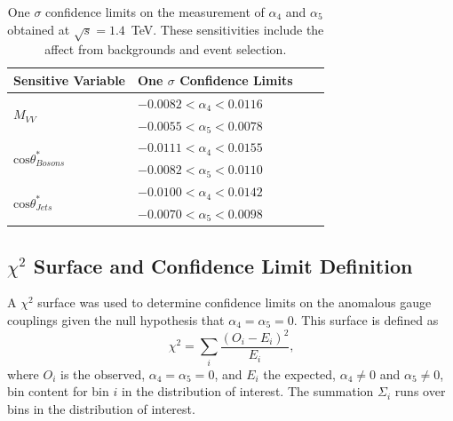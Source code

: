 \begin{table}[h!]
\centering
\begin{tabular}{l l l l}
\hline
Sensitive Variable & One $\sigma$ Confidence Limits \\
\hline
\multirow{ 2}{*}{$M_{VV}$} 					& $-0.0082 < \alpha_{4} < 0.0116$ \\
										& $-0.0055 < \alpha_{5} < 0.0078$ \\
\hline
\multirow{ 2}{*}{$\text{cos}\theta^{*}_{Bosons}$} 	& $-0.0111 < \alpha_{4} < 0.0155$ \\
										& $-0.0082 < \alpha_{5} < 0.0110$ \\
\hline
\multirow{ 2}{*}{$\text{cos}\theta^{*}_{Jets}$} 		& $-0.0100 < \alpha_{4} < 0.0142$ \\
										& $-0.0070 < \alpha_{5} < 0.0098$ \\
\end{tabular}
\caption[One $\sigma$ confidence limits on the measurement of $\alpha_{4}$ and $\alpha_{5}$ obtained at $\sqrt{s} = 1.4$~TeV.  These sensitivities include the affect from backgrounds and event selection.]{One $\sigma$ confidence limits on the measurement of $\alpha_{4}$ and $\alpha_{5}$ obtained at $\sqrt{s} = 1.4$~TeV.  These sensitivities include the affect from backgrounds and event selection.} 
\label{table:sensitivevariables}
\end{table}


\subsection{$\chi^{2}$ Surface and Confidence Limit Definition}
\label{sec:chi2surfacedefinition}
A $\chi^{2}$ surface was used to determine confidence limits on the anomalous gauge couplings given the null hypothesis that $\alpha_{4} = \alpha_{5} = 0$.  This surface is defined as  
%
\begin{equation}
\chi^{2} = \sum_{i} \frac{(O_{i} - E_{i})^{2}}{E_{i}} \text{,}
\end{equation}
%
\noindent where $O_{i}$ is the observed, $\alpha_{4} = \alpha_{5} = 0$, and $E_{i}$ the expected, $\alpha_{4} \neq 0$ and $\alpha_{5} \neq 0$, bin content for bin $i$ in the distribution of interest.  The summation $\Sigma_{i}$ runs over bins in the distribution of interest.  

